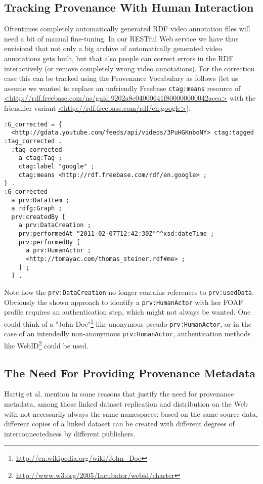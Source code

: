 \documentclass{acm_proc_article-sp}
\begin{document}
\subsection{Tracking Provenance With Human Interaction}\label{sec:human}
Oftentimes completely automatically generated RDF video annotation files will need a bit of manual fine-tuning. In our RESTful Web service we have thus envisiond that not only a big archive of automatically generated video annotations gets built, but that also people can correct errors in the RDF interactively (or remove completely wrong video annotations). For the correction case this can be tracked using the Provenance Vocabulary as follows (let us assume we wanted to replace an unfriendly Freebase \texttt{ctag:means} resource of \url{<http://rdf.freebase.com/ns/guid.9202a8c04000641f800000000042acea>} with the friendlier variant \url{<http://rdf.freebase.com/rdf/en.google>}):
\begin{verbatim}
:G_corrected = {
  <http://gdata.youtube.com/feeds/api/videos/3PuHGKnboNY> ctag:tagged :tag_corrected .
  :tag_corrected
    a ctag:Tag ;
    ctag:label "google" ;
    ctag:means <http://rdf.freebase.com/rdf/en.google> ;
} .
:G_corrected
  a prv:DataItem ;
  a rdfg:Graph ;
  prv:createdBy [
    a prv:DataCreation ;
    prv:performedAt "2011-02-07T12:42:30Z"^^xsd:dateTime ;
    prv:performedBy [
      a prv:HumanActor ;
      <http://tomayac.com/thomas_steiner.rdf#me> ;
    ] ;
  ] .
\end{verbatim}
Note how the \texttt{prv:DataCreation} no longer contains references to \texttt{prv:usedData}. Obviously the shown approach to identify a \texttt{prv:HumanActor} with her FOAF profile requires an authentication step, which might not always be wanted. One could think of a "John Doe"\footnote{\url{http://en.wikipedia.org/wiki/John_Doe}}-like anonymous pseudo-\texttt{prv:HumanActor}, or in the case of an intendedly non-anonymous \texttt{prv:HumanActor}, authentication methods like WebID\footnote{\url{http://www.w3.org/2005/Incubator/webid/charter}} could be used.

\subsection{The Need For Providing Provenance Metadata}
Hartig et al. mention in \cite{ipaw10:olaf} some reasons that justify the need for provenance metadata, among those linked dataset replication and distribution on the Web with not necessarily always the same namespaces: based on the same source data, different copies of a linked dataset can be created with different degrees of interconnectedness by different publishers.
\end{document}
